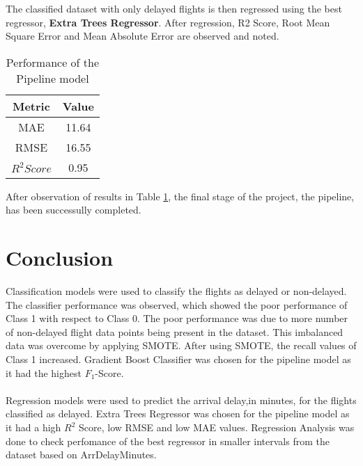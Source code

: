 \documentclass[12pt,letter-paper]{article}
\begin{document}
    The classified dataset with only delayed flights is then regressed using the best regressor, {\bfseries Extra Trees Regressor}. After regression, R2 Score, Root Mean Square Error and Mean Absolute Error are observed and noted.

    \begin{table}[H]
            \centering
            \begin{tabular}{ |c|c|} 
                 \hline
                 Metric & Value\\ 
                 \hline
                 MAE & 11.64 \\  
                 \hline
                 RMSE & 16.55\\ 
                 \hline
                 $R^2 Score$ & 0.95\\ 
                 \hline
            \end{tabular}
            \caption{Performance of the Pipeline model}
            \label{table:11}
        \end{table}
    
    After observation of results in Table \ref{table:11}, the final stage of the project, the pipeline, has been successully completed. 
    
\section{Conclusion}
    
    Classification models were used to classify the flights as delayed or non-delayed. The classifier performance was observed, which showed the poor performance of Class 1 with respect to Class 0. The poor performance was due to more number of non-delayed flight data points being present in the dataset. This imbalanced data was overcome by applying SMOTE. After using SMOTE, the recall values of Class 1 increased. Gradient Boost Classifier was chosen for the pipeline model as it had the highest $F_1$-Score.
    
    \paragraph{}
    Regression models were used to predict the arrival delay,in minutes, for the flights classified as delayed. Extra Trees Regressor was chosen for the pipeline model as it had a high $R^2$ Score, low RMSE and low MAE values. Regression Analysis was done to check perfomance of the best regressor in smaller intervals from the dataset based on ArrDelayMinutes.
    
\end{document}
